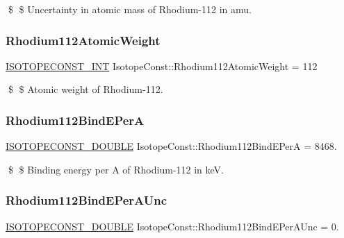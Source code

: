\$ \$ Uncertainty in atomic mass of Rhodium-\/112 in amu. \mbox{\label{group___isotope_const-_rhodium-_rh112_gad28417c6fac84bf5767b92d97b66c7e8}} 
\subsubsection{\texorpdfstring{Rhodium112\+Atomic\+Weight}{Rhodium112AtomicWeight}}
{\footnotesize\ttfamily \mbox{\hyperlink{group___isotope_const-_macros_ga5f18360b3e99483a35c32d789e62621c}{I\+S\+O\+T\+O\+P\+E\+C\+O\+N\+S\+T\+\_\+\+I\+NT}} Isotope\+Const\+::\+Rhodium112\+Atomic\+Weight = 112}

\$ \$ Atomic weight of Rhodium-\/112. \mbox{\label{group___isotope_const-_rhodium-_rh112_gac17dc36f173957d5c4bf29dbcc76a26c}} 
\subsubsection{\texorpdfstring{Rhodium112\+Bind\+E\+PerA}{Rhodium112BindEPerA}}
{\footnotesize\ttfamily \mbox{\hyperlink{group___isotope_const-_macros_ga8f45a7272ce02c0b4c65c44636ed719a}{I\+S\+O\+T\+O\+P\+E\+C\+O\+N\+S\+T\+\_\+\+D\+O\+U\+B\+LE}} Isotope\+Const\+::\+Rhodium112\+Bind\+E\+PerA = 8468.}

\$ \$ Binding energy per A of Rhodium-\/112 in keV. \mbox{\label{group___isotope_const-_rhodium-_rh112_gad7264eeb162e57fa620f9808a6ccce0d}} 
\subsubsection{\texorpdfstring{Rhodium112\+Bind\+E\+Per\+A\+Unc}{Rhodium112BindEPerAUnc}}
{\footnotesize\ttfamily \mbox{\hyperlink{group___isotope_const-_macros_ga8f45a7272ce02c0b4c65c44636ed719a}{I\+S\+O\+T\+O\+P\+E\+C\+O\+N\+S\+T\+\_\+\+D\+O\+U\+B\+LE}} Isotope\+Const\+::\+Rhodium112\+Bind\+E\+Per\+A\+Unc = 0.}

